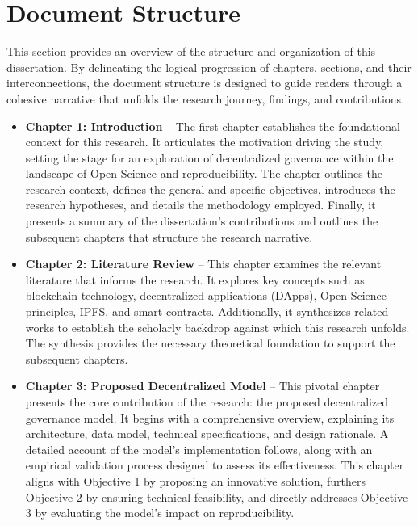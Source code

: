 \documentclass{article}
\begin{document}
\section{Document Structure}

This section provides an overview of the structure and organization of this dissertation. By delineating the logical progression of chapters, sections, and their interconnections, the document structure is designed to guide readers through a cohesive narrative that unfolds the research journey, findings, and contributions.

\begin{itemize}
    \item \textbf{Chapter 1: Introduction} – The first chapter establishes the foundational context for this research. It articulates the motivation driving the study, setting the stage for an exploration of decentralized governance within the landscape of Open Science and reproducibility. The chapter outlines the research context, defines the general and specific objectives, introduces the research hypotheses, and details the methodology employed. Finally, it presents a summary of the dissertation’s contributions and outlines the subsequent chapters that structure the research narrative.

    \item \textbf{Chapter 2: Literature Review} – This chapter examines the relevant literature that informs the research. It explores key concepts such as blockchain technology, decentralized applications (DApps), Open Science principles, IPFS, and smart contracts. Additionally, it synthesizes related works to establish the scholarly backdrop against which this research unfolds. The synthesis provides the necessary theoretical foundation to support the subsequent chapters.

    \item \textbf{Chapter 3: Proposed Decentralized Model} – This pivotal chapter presents the core contribution of the research: the proposed decentralized governance model. It begins with a comprehensive overview, explaining its architecture, data model, technical specifications, and design rationale. A detailed account of the model’s implementation follows, along with an empirical validation process designed to assess its effectiveness. This chapter aligns with Objective 1 by proposing an innovative solution, furthers Objective 2 by ensuring technical feasibility, and directly addresses Objective 3 by evaluating the model’s impact on reproducibility.


\end{itemize}
\end{document}
